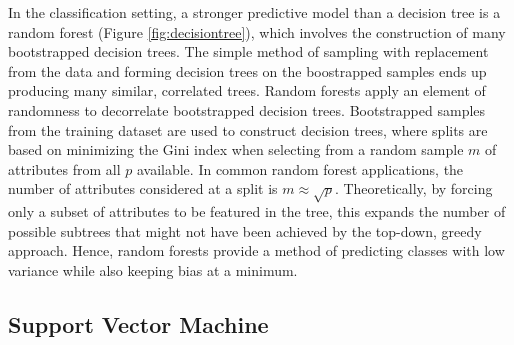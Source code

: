 \documentclass[12pt,twoside]{reedthesis}
\begin{document}
In the classification setting, a stronger predictive model than a decision tree is a random forest (Figure \ref{fig:decisiontree}), which involves the construction of many bootstrapped decision trees. The simple method of sampling with replacement from the data and forming decision trees on the boostrapped samples ends up producing many similar, correlated trees. Random forests apply an element of randomness to decorrelate bootstrapped decision trees. Bootstrapped samples from the training dataset are used to construct decision trees, where splits are based on minimizing the Gini index when selecting from a random sample \(m\) of attributes from all \(p\) available. In common random forest applications, the number of attributes considered at a split is \(m \approx \sqrt{p}\). Theoretically, by forcing only a subset of attributes to be featured in the tree, this expands the number of possible subtrees that might not have been achieved by the top-down, greedy approach. Hence, random forests provide a method of predicting classes with low variance while also keeping bias at a minimum.

\hypertarget{support-vector-machine}{%
\subsection{Support Vector Machine}\label{support-vector-machine}}
\end{document}
